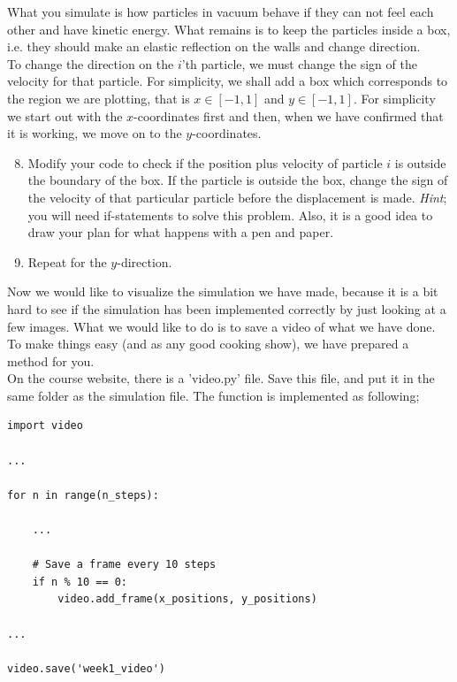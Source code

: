 \documentclass{article}
\begin{document}
What you simulate is how particles in vacuum behave if they can not feel
each other and have kinetic energy. What remains is to keep the particles
inside a box, i.e. they should make an elastic reflection on the walls and
change direction. \\

To change the direction on the $i$'th particle, we must change
the sign of the velocity for that particle. For simplicity, we shall add a box
which corresponds to the region we are plotting, that is $x \in [-1,1]$ 
and $y \in [-1,1]$.
For simplicity we start out with the $x$-coordinates first and then, when we
have confirmed that it is working, we move on to the $y$-coordinates.

\begin{enumerate}
  \setcounter{enumi}{7}
  \item Modify your code to check if the position plus velocity of particle $i$
      is outside the boundary of the box.
      If the particle is outside the box, change the sign of the velocity of that
      particular particle before the displacement is made.
      {\em Hint}; you will need if-statements to solve this problem. Also, it
      is a good idea to draw your plan for what happens with a pen and paper.

  \item Repeat for the $y$-direction.

\end{enumerate}

\newpage

Now we would like to visualize the simulation we have made, because
it is a bit hard to see if the simulation has been implemented correctly by
just looking at a few images.
What we would like to do is to save a video of what we have done.
To make things easy (and as any good cooking show), we have prepared
a method for you. \\

On the course website, there is a 'video.py' file.
Save this file, and put it in the same folder as the simulation file.
The function is implemented as following;

\begin{lstlisting}
import video

...

for n in range(n_steps):

    ...

    # Save a frame every 10 steps
    if n % 10 == 0:
        video.add_frame(x_positions, y_positions)

...

video.save('week1_video')

\end{lstlisting}
\end{document}
